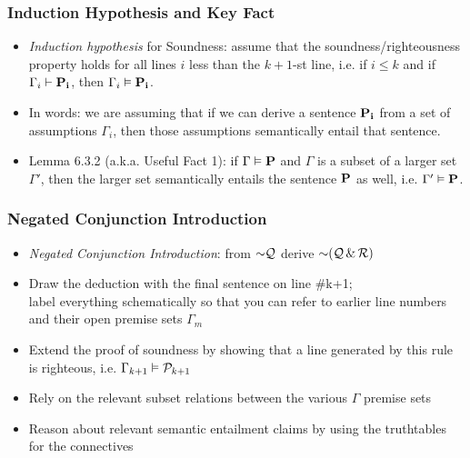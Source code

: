 \begin{frame}
\frametitle{Induction Hypothesis and Key Fact}

\begin{itemize}

\item {\it Induction hypothesis} for Soundness: assume that the soundness/righteousness property holds for all lines $i$ less than the $k +1$-st line, i.e. if $i \leq k$ and if $\Gamma_i \vdash\mathbf{P_i} $, then $\Gamma_i \vDash\mathbf{P_i} $. 

\item In words: we are assuming that if we can derive a sentence $\mathbf{P_i} $ from a set of assumptions $\Gamma_i$, then those assumptions semantically entail that sentence.

\item Lemma 6.3.2 (a.k.a. Useful Fact 1): if $\Gamma \vDash \mathbf{P}$ and $\Gamma $ is a subset of a larger set $\Gamma '$, then the larger set semantically entails the sentence $\mathbf{P}$ as well, i.e. $\Gamma ' \vDash \mathbf{P} $.


\end{itemize}
\end{frame}

\begin{frame}
\frametitle{Negated Conjunction Introduction}

\begin{itemize}[<+->]

\item \emph{Negated Conjunction Introduction}: from $\enot \metav{Q}$ derive $\enot (\metav{Q} \eand \metav{R})$

\item Draw the deduction with the final sentence on line \#k+1; \\ label everything schematically so that you can refer to earlier line numbers and their open premise sets $\Gamma_m$ 

\item Extend the proof of soundness by showing that a line generated by this rule is righteous, i.e. $\Gamma_{k+1} \vDash \mathcal{P}_{k+1}$

\item Rely on the relevant subset relations between the various $\Gamma$ premise sets

\item Reason about relevant semantic entailment claims by using the truthtables for the connectives

\end{itemize}
\end{frame}

